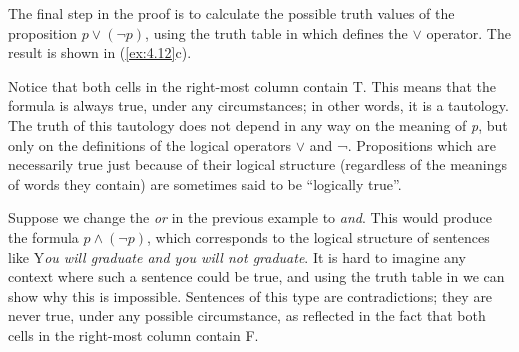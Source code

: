\largerpage
The final step in the proof is to calculate the possible truth values of the proposition $p\vee (\neg p)$, using the truth table in  which defines the \textit{$\vee$} operator. The result is shown in (\ref{ex:4.12}c). 


\setcounter{equation}{11}

Notice that both cells in the right-most column contain T. This means that the formula is always true, under any circumstances; in other words, it is a tautology. The truth of this tautology does not depend in any way on the meaning of \textit{p}, but only on the definitions of the logical operators $\vee$ and ¬. Propositions which are necessarily true just because of their logical structure (regardless of the meanings of words they contain) are sometimes said to be “logically true”.



Suppose we change the \textit{or} in the previous example to \textit{and}. This would produce the formula $p\wedge(\neg p)$, which corresponds to the logical structure of sentences like Y\textit{ou will graduate and you will not graduate}. It is hard to imagine any context where such a sentence could be true, and using the truth table in  we can show why this is impossible. Sentences of this type are contradictions; they are never true, under any possible circumstance, as reflected in the fact that both cells in the right-most column contain F.



